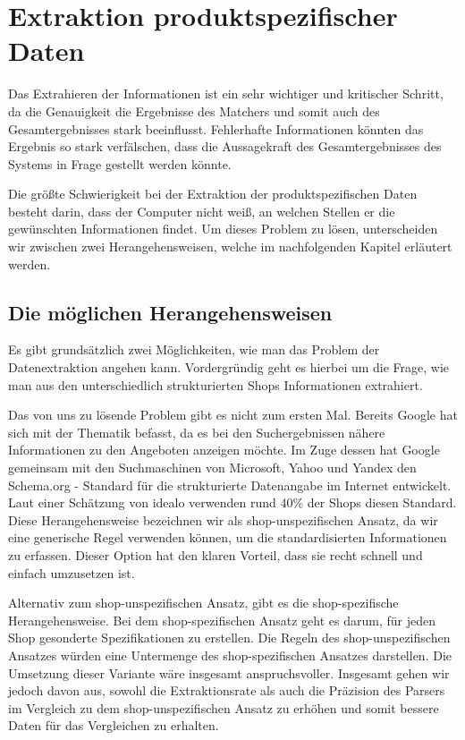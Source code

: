 \section{Extraktion produktspezifischer Daten}
\label{sec:extraktion-produktspezifischer-daten}

Das Extrahieren der Informationen ist ein sehr wichtiger und kritischer Schritt, da die Genauigkeit die Ergebnisse
des Matchers und somit auch des Gesamtergebnisses stark beeinflusst.
Fehlerhafte Informationen könnten das Ergebnis so stark verfälschen, dass die Aussagekraft des Gesamtergebnisses des
Systems in Frage gestellt werden könnte.

Die größte Schwierigkeit bei der Extraktion der produktspezifischen Daten besteht darin, dass der Computer nicht
weiß, an welchen Stellen er die gewünschten Informationen findet.
Um dieses Problem zu lösen, unterscheiden wir zwischen zwei Herangehensweisen, welche im nachfolgenden Kapitel
erläutert werden.

\subsection{Die möglichen Herangehensweisen}
\label{subsec:herangehensweisen}

\begin{comment}
    schema.org
\end{comment}

Es gibt grundsätzlich zwei Möglichkeiten, wie man das Problem der Datenextraktion angehen kann.
Vordergründig geht es hierbei um die Frage, wie man aus den unterschiedlich strukturierten Shops Informationen
extrahiert.

Das von uns zu lösende Problem gibt es nicht zum ersten Mal.
Bereits Google hat sich mit der Thematik befasst, da es bei den Suchergebnissen nähere Informationen zu den Angeboten
anzeigen möchte.
Im Zuge dessen hat Google gemeinsam mit den Suchmaschinen von Microsoft, Yahoo und Yandex den Schema.org - Standard für
die strukturierte Datenangabe im Internet entwickelt.
Laut einer Schätzung von idealo verwenden rund 40\% der Shops diesen Standard.
Diese Herangehensweise bezeichnen wir als shop-unspezifischen Ansatz, da wir eine generische Regel verwenden können,
um die standardisierten Informationen zu erfassen.
Dieser Option hat den klaren Vorteil, dass sie recht schnell und einfach umzusetzen ist.

Alternativ zum shop-unspezifischen Ansatz, gibt es die shop-spezifische Herangehensweise.
Bei dem shop-spezifischen Ansatz geht es darum, für jeden Shop gesonderte Spezifikationen zu erstellen.
Die Regeln des shop-unspezifischen Ansatzes würden eine Untermenge des shop-spezifischen Ansatzes darstellen.
Die Umsetzung dieser Variante wäre insgesamt anspruchsvoller.
Insgesamt gehen wir jedoch davon aus, sowohl die Extraktionsrate als auch die Präzision des Parsers im Vergleich zu
dem shop-unspezifischen Ansatz zu erhöhen und somit bessere Daten für das Vergleichen zu erhalten.

